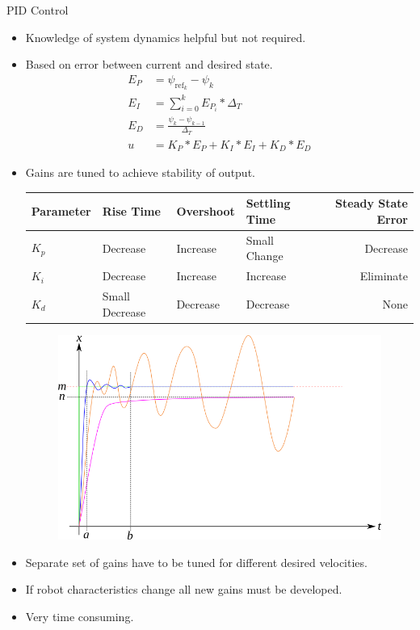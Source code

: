 \documentclass[hyperref={pdfpagelabels=false}]{beamer}
\begin{document}
\begin{frame}[allowframebreaks]{PID Control}
\begin{itemize}
\item Knowledge of system dynamics helpful but not required.
\item Based on error between current and desired state.
\begin{align*}
E_P &= \psi_{\text{ref}_k} - \psi_k \\
E_I &= \sum_{i=0}^{k}E_{P_i}*\Delta_T \\
E_D &= \frac{\psi_k - \psi_{k-1}}{\Delta_T} \\
u &= K_P*E_P + K_I*E_I + K_D*E_D
\end{align*}
\item Gains are tuned to achieve stability of output.

\begin{table}[ht!]
\tiny
\centering
\begin{tabular}{@{}llllr@{}} \toprule
Parameter    & Rise Time      & Overshoot & Settling Time & Steady State Error \\ \midrule
$K_p$        & Decrease       & Increase  & Small Change  & Decrease \\
$K_i$        & Decrease       & Increase  & Increase      & Eliminate \\
$K_d$        & Small Decrease & Decrease  & Decrease      & None \\ \bottomrule
\end{tabular}
\end{table}

\begin{figure}[ht!]
	\centering
	\includegraphics[width=.7\textwidth]{images/pid}
\end{figure}

\item Separate set of gains have to be tuned for different desired velocities.
\item If robot characteristics change all new gains must be developed.
\item Very time consuming.
\end{itemize}
\end{frame}
\end{document}
